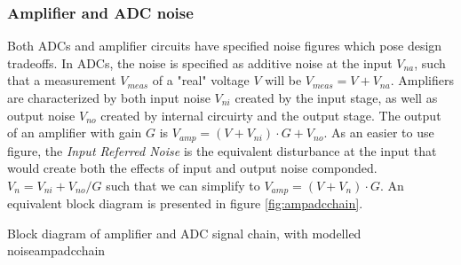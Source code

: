 \documentclass{thesis}
\begin{document}
\subsubsection{Amplifier and ADC noise} \label{ampandadcnoise}

Both ADCs and amplifier circuits have specified noise figures which pose design tradeoffs. In ADCs, the noise is specified as additive noise at the input $V_{na}$, such that a measurement $V_{meas}$ of a "real" voltage $V$ will be $V_{meas} = V + V_{na}$. Amplifiers are characterized by both input noise $V_{ni}$ created by the input stage, as well as output noise $V_{no}$ created by internal circuirty and the output stage. The output of an amplifier with gain $G$ is $V_{amp} = (V + V_{ni}) \cdot G + V_{no}$. As an easier to use figure, the \textit{Input Referred Noise} is the equivalent disturbance at the input that would create both the effects of input and output noise componded. $V_n = V_{ni} + V_{no}/G$ such that we can simplify to $V_{amp} = (V + V_n) \cdot G$. An equivalent block diagram is presented in figure \ref{fig:ampadcchain}.

\begin{thesisfigure}{Block diagram of amplifier and ADC signal chain, with modelled noise}{ampadcchain}



\end{thesisfigure}
\end{document}
